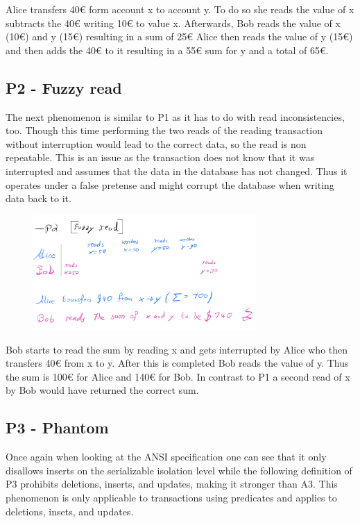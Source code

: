 \documentclass[sigconf, review=true]{acmart}
\begin{document}
\begin{example}
    Alice transfers 40€ form account x to account y.
    To do so she reads the value of x subtracts the 40€ writing 10€ to value x.
    Afterwards, Bob reads the value of x (10€) and y (15€) resulting in a sum of 25€
    Alice then reads the value of y (15€) and then adds the 40€ to it resulting in a 55€ sum for y
    and a total of 65€.
\end{example}

\subsection{P2 - Fuzzy read}
The next phenomenon is similar to P1 as it has to do with read inconsistencies, too.
Though this time performing the two reads of the reading transaction without interruption would lead
to the correct data, so the read is non repeatable. This is an issue as the transaction does not know that
it was interrupted and assumes that the data in the database has not changed. Thus it operates under a false pretense
and might corrupt the database when writing data back to it.

\begin{figure}[h]
    
    \includegraphics[width=8.5cm]{P2}
    
\end{figure}

\begin{example}
    Bob starts to read the sum by reading x and gets interrupted by Alice who then transfers 40€ from x to y. 
    After this is completed Bob reads the value of y.
    Thus the sum is 100€ for Alice and 140€ for Bob.
    In contrast to P1 a second read of x by Bob would have returned the correct sum.
\end{example}
\subsection{P3 - Phantom}
Once again when looking at the ANSI specification one can see that it only disallows inserts on the serializable
isolation level while the following definition of P3 prohibits deletions, inserts, and updates, making it stronger than A3.
This phenomenon is only applicable to transactions using predicates and applies to deletions, insets, and updates.
\end{document}
